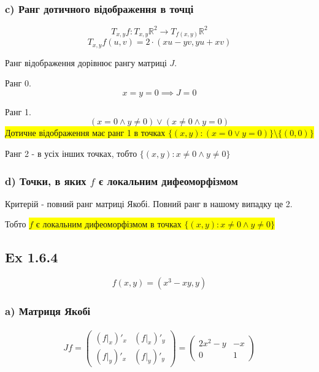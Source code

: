 \documentclass[10pt, a4paper]{article} %
\newcommand{\R}{\mathbb{R}}
\newcommand{\todo}[1]{\colorbox{red}{\textbf{TODO}: #1}}
\begin{document}
\subsubsection*{c) Ранг дотичного відображення в точці}
\[T_{x,y}f : T_{x,y}\R^2 \to T_{f(x,y)}\R^2\]
\[T_{x,y}f(u,v) = 2\cdot (xu-yv, yu+xv)\]

Ранг відображення дорівнює рангу матриці $J$.

Ранг 0.
\[x=y=0 \implies J=0\]

Ранг 1.
\[(x=0 \land y\ne 0) \vee (x\ne 0 \land y=0)\]
\colorbox{yellow}{Дотичне відображення має ранг 1 в точках $\{(x,y) : (x=0 \vee y=0) \} \setminus \{(0,0)\}$}

Ранг 2 - в усіх інших точках, тобто $\{(x,y) : x\ne 0 \land y \ne 0\}$

\subsubsection*{d) Точки, в яких $f$ є локальним дифеоморфізмом}
Критерій - повний ранг матриці Якобі.
Повний ранг в нашому випадку це 2.

Тобто \colorbox{yellow}{$f$ є локальним дифеоморфізмом в точках $\{(x,y) : x\ne 0 \land y \ne 0\}$}


\subsection*{Ex 1.6.4}
\[f(x,y) = (x^3-xy, y)\]
\subsubsection*{a) Матриця Якобі}
\begin{align*}
    Jf = \begin{pmatrix}
        (f|_x)'_x & (f|_x)'_y\\
        (f|_y)'_x & (f|_y)'_y
    \end{pmatrix} 
    = \begin{pmatrix}
        2x^2-y & -x\\
        0 & 1
    \end{pmatrix}
\end{align*}
\end{document}
